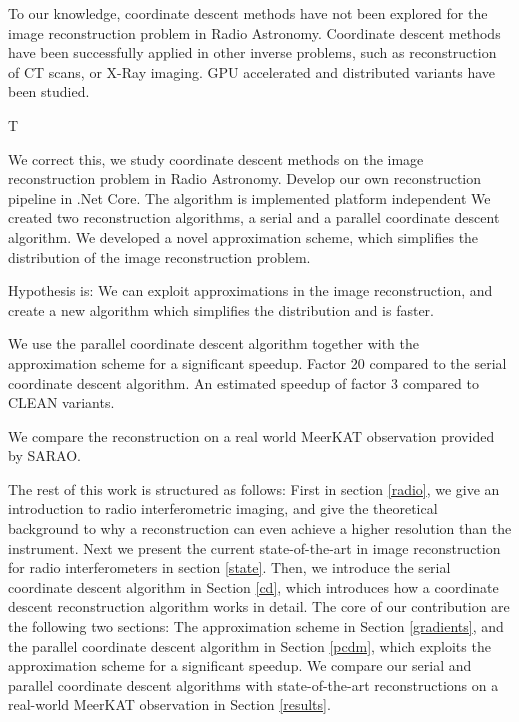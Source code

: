 To our knowledge, coordinate descent methods have not been explored for the image reconstruction problem in Radio Astronomy. Coordinate descent methods have been successfully applied in other inverse problems, such as reconstruction of CT scans\cite{bouman1996unified}, or X-Ray imaging\cite{felix2017compressed}. GPU accelerated\cite{mcgaffin2015edge} and distributed\cite{fercoq2014fast} variants have been studied. 

T

We correct this, we study coordinate descent methods on the image reconstruction problem in Radio Astronomy.
Develop our own reconstruction pipeline in .Net Core.
The algorithm is implemented platform independent 
We created two reconstruction algorithms, a serial and a parallel coordinate descent algorithm. We developed a novel approximation scheme, which simplifies the distribution of the image reconstruction problem.

Hypothesis is: We can exploit approximations in the image reconstruction, and create a new algorithm which simplifies the distribution and is faster.

We use the parallel coordinate descent algorithm together with the approximation scheme for a significant speedup.
Factor 20 compared to the serial coordinate descent algorithm.
An estimated speedup of factor 3 compared to CLEAN variants.

We compare the reconstruction on a real world MeerKAT observation provided by SARAO.


The rest of this work is structured as follows: First in section \ref{radio}, we give an introduction to radio interferometric imaging, and give the theoretical background to why a reconstruction can even achieve a higher resolution than the instrument. Next we present the current state-of-the-art in image reconstruction for radio interferometers in section \ref{state}. Then, we introduce the serial coordinate descent algorithm in Section \ref{cd}, which introduces how a coordinate descent reconstruction algorithm works in detail. The core of our contribution are the following two sections: The approximation scheme in Section \ref{gradients}, and the parallel coordinate descent algorithm in Section \ref{pcdm}, which exploits the approximation scheme for a significant speedup. We compare our serial and parallel coordinate descent algorithms with state-of-the-art reconstructions on a real-world MeerKAT observation in Section \ref{results}. 

